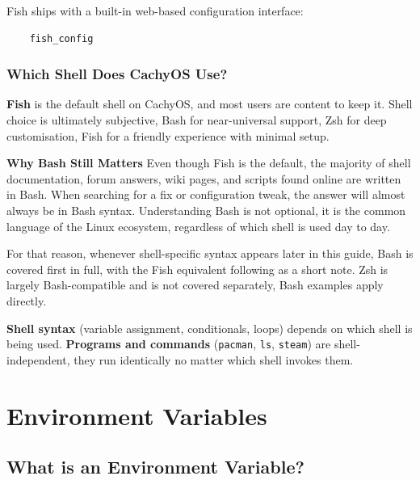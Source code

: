 \documentclass{article}
\newcommand{\code}[1]{\colorbox{codebg}{\texttt{#1}}}
\begin{document}
\noindent Fish ships with a built-in web-based configuration interface:

\begin{verbatim}
	fish_config
\end{verbatim}

\subsubsection{Which Shell Does CachyOS Use?}

\textbf{Fish} is the default shell on CachyOS, and most users are content to keep it. Shell choice is ultimately subjective, Bash for near-universal
support, Zsh for deep customisation, Fish for a friendly experience with minimal
setup.

\begin{callout}{\textbf{Why Bash Still Matters}}
	Even though Fish is the default, the majority of shell documentation, forum
	answers, wiki pages, and scripts found online are written in Bash. When
	searching for a fix or configuration tweak, the answer will almost always be
	in Bash syntax. Understanding Bash is not optional, it is the common
	language of the Linux ecosystem, regardless of which shell is used day to day.
\end{callout}

\noindent For that reason, whenever shell-specific syntax appears later in this
guide, Bash is covered first in full, with the Fish equivalent following as a
short note. Zsh is largely Bash-compatible and is not covered separately, Bash
examples apply directly.

\begin{tcolorbox}[arc=12pt, outer arc=10pt,
	colback=blue!4!white, colframe=blue!40!black,
	title=\textbf{A Useful Distinction}]
	\textbf{Shell syntax} (variable assignment, conditionals, loops) depends on
	which shell is being used. \textbf{Programs and commands} (\code{pacman},
	\code{ls}, \code{steam}) are shell-independent, they run identically no
	matter which shell invokes them.
\end{tcolorbox}

\newpage
\section{Environment Variables}

\subsection{What is an Environment Variable?}
\end{document}
